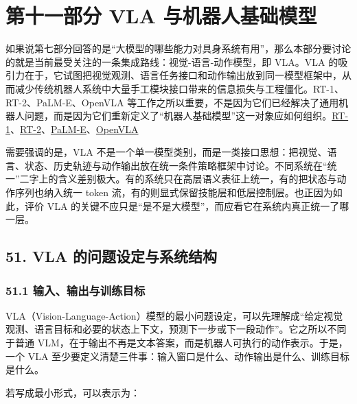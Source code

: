 
\part*{第十一部分 VLA 与机器人基础模型}

如果说第七部分回答的是“大模型的哪些能力对具身系统有用”，那么本部分要讨论的就是当前最受关注的一条集成路线：视觉-语言-动作模型，即 VLA。VLA 的吸引力在于，它试图把视觉观测、语言任务接口和动作输出放到同一模型框架中，从而减少传统机器人系统中大量手工模块接口带来的信息损失与工程僵化。RT-1、RT-2、PaLM-E、OpenVLA 等工作之所以重要，不是因为它们已经解决了通用机器人问题，而是因为它们重新定义了“机器人基础模型”这一对象应如何组织。\href{https://arxiv.org/abs/2212.06817}{RT-1}、\href{https://arxiv.org/abs/2307.15818}{RT-2}、\href{https://arxiv.org/abs/2303.03378}{PaLM-E}、\href{https://arxiv.org/abs/2406.09246}{OpenVLA}

需要强调的是，VLA 不是一个单一模型类别，而是一类接口思想：把视觉、语言、状态、历史轨迹与动作输出放在统一条件策略框架中讨论。不同系统在“统一”二字上的含义差别极大。有的系统只在高层语义表征上统一，有的把状态与动作序列也纳入统一 token 流，有的则显式保留技能层和低层控制层。也正因为如此，评价 VLA 的关键不应只是“是不是大模型”，而应看它在系统内真正统一了哪一层。

\chapter*{51. VLA 的问题设定与系统结构}

\section*{51.1 输入、输出与训练目标}


VLA（Vision-Language-Action）模型的最小问题设定，可以先理解成“给定视觉观测、语言目标和必要的状态上下文，预测下一步或下一段动作”。它之所以不同于普通 VLM，在于输出不再是文本答案，而是机器人可执行的动作表示。于是，一个 VLA 至少要定义清楚三件事：输入窗口是什么、动作输出是什么、训练目标是什么。

若写成最小形式，可以表示为：

